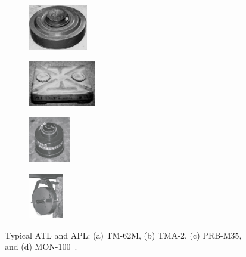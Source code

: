 \begin{figure}[h]
    \centering
    \begin{subfigure}[b]{0.24\textwidth}
        \centering
        \includegraphics[height=2cm]{figs/Huirui/tm62m.png}
    \end{subfigure}
    \begin{subfigure}[b]{0.24\textwidth}
        \centering
        \includegraphics[height=2cm]{figs/Huirui/tma2.png}
    \end{subfigure}
    \begin{subfigure}[b]{0.24\textwidth}
        \centering
        \includegraphics[height=2cm]{figs/Huirui/prbm35.png}
    \end{subfigure}
    \begin{subfigure}[b]{0.24\textwidth}
        \centering
        \includegraphics[height=2cm]{figs/Huirui/mon100.png}
    \end{subfigure}

    \caption{Typical \gls{ATL} and \gls{APL}: (a) TM-62M, (b) TMA-2, (c) PRB-M35, and (d) MON-100~\cite{paik2002image}.}
    \label{fig:mine_examples}
\end{figure}


